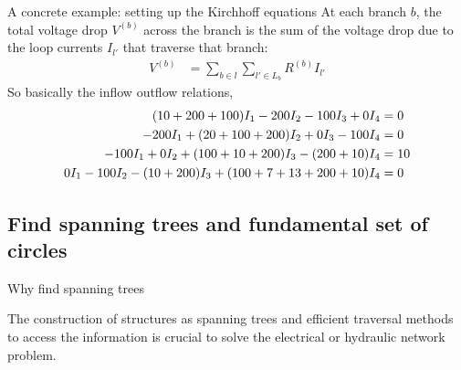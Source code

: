 \documentclass[xcolor=dvipsnames]{beamer}
\begin{document}
\begin{frame}{A concrete example: setting up the Kirchhoff equations}
At each branch $b$, the total voltage drop $V^{(b)}$ across the branch is the sum of the voltage drop due to the loop currents $I_{l'}$ that traverse that branch:
\begin{align*}
	V^{(b)} &= \sum_{b\in l}\sum_{l'\in L_b} R^{(b)}I_{l'}
\end{align*}
So basically the inflow outflow relations,
\begin{align}\label{eq1}
	(10 + 200 + 100)I_1 - 200 I_2 - 100 I_3 + 0 I_4 &= 0\\
	-200 I_1 + (20 + 100 + 200) I_2 + 0 I_3 - 100 I_4 &= 0\notag\\
	-100 I_1 + 0 I_2 + (100 + 10 + 200)I_3 - (200+10)I_4 &=10\notag\\
	0 I_1 - 100 I_2 - (10+200) I_3 + (100 + 7 + 13 + 200 + 10) I_4 &= 0\notag
\end{align}
\end{frame}

\subsection{Find spanning trees and fundamental set of circles}

\begin{frame}{Why find spanning trees}

The construction of structures as spanning trees and efficient
traversal methods to access the information is crucial to solve the electrical or hydraulic network problem.
	
\end{frame}

\begin{frame}
	
\end{frame}
\end{document}
